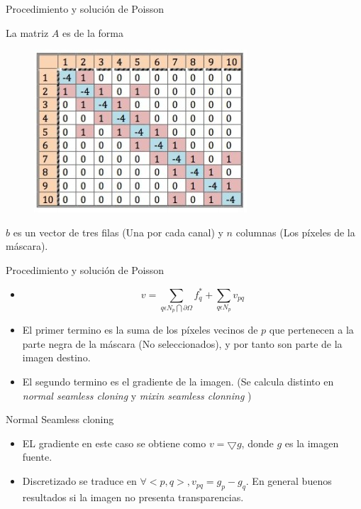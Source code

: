 \begin{frame}{Procedimiento y solución de Poisson}
  \begin{block}{}
  La matriz $A$ es de la forma
  \begin{figure}[H]
  \centering
  \includegraphics[scale=.4]{./img/kernel}
  \end{figure}
  $b$ es un vector de tres filas (Una por cada canal) y $n$ columnas (Los píxeles de la máscara).
  \end{block}
\end{frame}

\begin{frame}{Procedimiento y solución de Poisson}
  \begin{itemize}
    \item \[ v =\sum_{q\epsilon N_{p}\bigcap \partial\Omega}f^{*}_{q}+\sum_{q\epsilon N_{p}}v_{pq}\]
    \item<2-> El primer termino es la suma de los píxeles vecinos de $p$ que pertenecen a la parte negra de la máscara (No seleccionados), y por tanto son parte de la imagen destino.
    \item<3-> El segundo termino es el gradiente de la imagen. (Se calcula distinto en \textit{normal seamless cloning} y \textit{mixin seamless clonning}  )
  \end{itemize}
\end{frame}

\begin{frame}{Normal Seamless cloning}
  \begin{itemize}
    \item EL gradiente en este caso se obtiene como $v= \bigtriangledown g $, donde $g$ es la imagen fuente.
    \item<2-> Discretizado se traduce en $\forall <p,q>,v_{pq} =g_{p}-g_{q}$. En general buenos resultados si la imagen no presenta transparencias.
  \end{itemize}
\end{frame}

